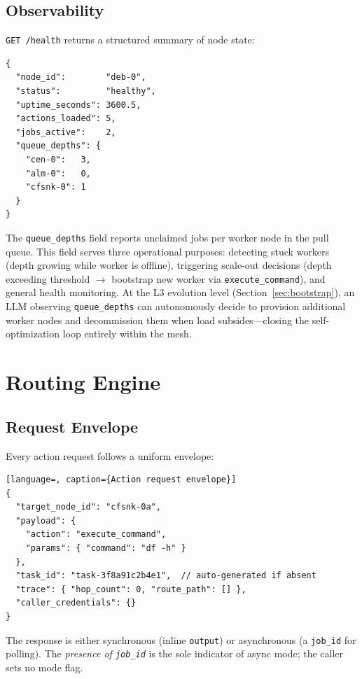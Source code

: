 \documentclass[10pt,twocolumn]{article}
\begin{document}
\subsection{Observability}
\label{sec:health}

\texttt{GET /health} returns a structured summary of node state:

\begin{lstlisting}[caption={Health endpoint response}]
{
  "node_id":        "deb-0",
  "status":         "healthy",
  "uptime_seconds": 3600.5,
  "actions_loaded": 5,
  "jobs_active":    2,
  "queue_depths": {
    "cen-0":   3,
    "alm-0":   0,
    "cfsnk-0": 1
  }
}
\end{lstlisting}

The \texttt{queue\_depths} field reports unclaimed jobs per worker
node in the pull queue. This field serves three operational purposes:
detecting stuck workers (depth growing while worker is offline),
triggering scale-out decisions (depth exceeding threshold $\to$
bootstrap new worker via \texttt{execute\_command}), and general
health monitoring. At the L3 evolution level
(Section~\ref{sec:bootstrap}), an LLM observing
\texttt{queue\_depths} can autonomously decide to provision additional
worker nodes and decommission them when load subsides---closing the
self-optimization loop entirely within the mesh.

\FloatBarrier
\section{Routing Engine}
\label{sec:routing}

\subsection{Request Envelope}

Every action request follows a uniform envelope:

\begin{lstlisting}[language=, caption={Action request envelope}]
{
  "target_node_id": "cfsnk-0a",
  "payload": {
    "action": "execute_command",
    "params": { "command": "df -h" }
  },
  "task_id": "task-3f8a91c2b4e1",  // auto-generated if absent
  "trace": { "hop_count": 0, "route_path": [] },
  "caller_credentials": {}
}
\end{lstlisting}

The response is either synchronous (inline \texttt{output}) or
asynchronous (a \texttt{job\_id} for polling). The \emph{presence of
\texttt{job\_id}} is the sole indicator of async mode; the caller sets
no mode flag.
\end{document}
